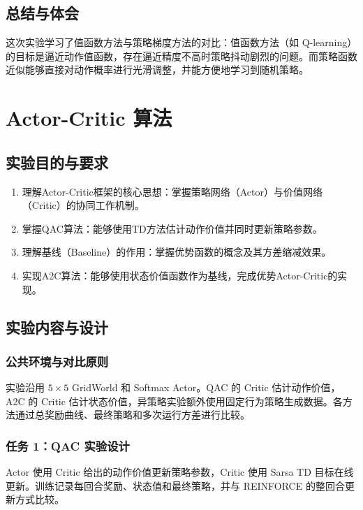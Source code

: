 \documentclass[11pt,a4paper,UTF8]{ctexart}
\numberwithin{figure}{section}
\numberwithin{table}{section}
\begin{document}
\subsection{总结与体会}


这次实验学习了值函数方法与策略梯度方法的对比：值函数方法（如 Q-learning）的目标是逼近动作值函数，存在逼近精度不高时策略抖动剧烈的问题。而策略函数近似能够直接对动作概率进行光滑调整，并能方便地学习到随机策略。

\newpage
\section{Actor-Critic 算法}

\subsection{实验目的与要求}
\begin{enumerate}
\item 理解Actor-Critic框架的核心思想：掌握策略网络（Actor）与价值网络（Critic）的协同工作机制。
\item 掌握QAC算法：能够使用TD方法估计动作价值并同时更新策略参数。
\item 理解基线（Baseline）的作用：掌握优势函数的概念及其方差缩减效果。
\item 实现A2C算法：能够使用状态价值函数作为基线，完成优势Actor-Critic的实现。
\end{enumerate}
\subsection{实验内容与设计}

\subsubsection{公共环境与对比原则}

实验沿用 $5\times5$ GridWorld 和 Softmax Actor。QAC 的 Critic 估计动作价值，A2C 的 Critic 估计状态价值，异策略实验额外使用固定行为策略生成数据。各方法通过总奖励曲线、最终策略和多次运行方差进行比较。

\subsubsection{任务 1：QAC 实验设计}

Actor 使用 Critic 给出的动作价值更新策略参数，Critic 使用 Sarsa TD 目标在线更新。训练记录每回合奖励、状态值和最终策略，并与 REINFORCE 的整回合更新方式比较。
\end{document}
